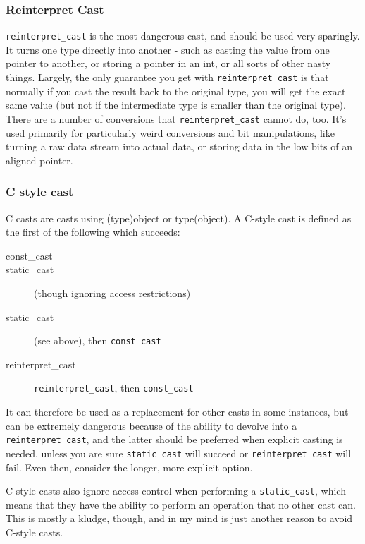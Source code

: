 \subsubsection{Reinterpret Cast}
\verb$reinterpret_cast$ is the most dangerous cast, and should be used very
sparingly.  It turns one type directly into another - such as casting
the value from one pointer to another, or storing a pointer in an int,
or all sorts of other nasty things.  Largely, the only guarantee you
get with \verb$reinterpret_cast$ is that normally if you cast the result
back to the original type, you will get the exact same value (but not
if the intermediate type is smaller than the original type).  There
are a number of conversions that \verb$reinterpret_cast$ cannot do, too.
It's used primarily for particularly weird conversions and bit
manipulations, like turning a raw data stream into actual data, or
storing data in the low bits of an aligned pointer.

\subsubsection{C style cast}

C casts are casts using (type)object or type(object).
A C-style cast is defined as the first of the following which succeeds:
\begin{description}
\item [const\_cast]
\item [static\_cast] (though ignoring access restrictions)
\item [static\_cast] (see above), then \verb$const_cast$
\item [reinterpret\_cast] \verb$reinterpret_cast$, then \verb$const_cast$
\end{description}

It can therefore be used as a replacement for other casts in some
instances, but can be extremely dangerous because of the ability to
devolve into a \verb$reinterpret_cast$, and the latter should be preferred
when explicit casting is needed, unless you are sure \verb$static_cast$
will succeed or \verb$reinterpret_cast$ will fail.  Even then, consider the
longer, more explicit option.

C-style casts also ignore access control when performing a
\verb$static_cast$, which means that they have the ability to perform an
operation that no other cast can.  This is mostly a kludge, though,
and in my mind is just another reason to avoid C-style casts.

